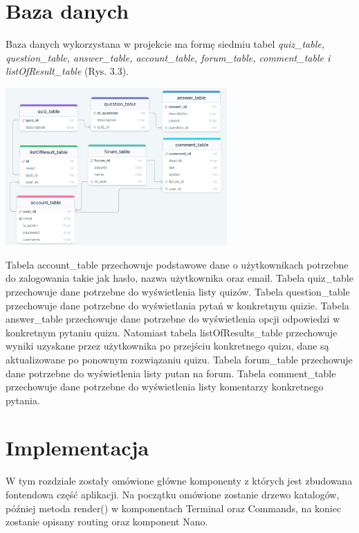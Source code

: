 \documentclass[10pt,a4paper]{report}
\begin{document}
\begin{adjustwidth}{2cm}{2cm}
\section{Baza danych}
\begin{minipage}{1\linewidth}
Baza danych wykorzystana w projekcie ma formę siedmiu tabel \textit{quiz\_table, question\_table, answer\_table, account\_table, forum\_table, comment\_table i listOfResult\_table} (Rys. 3.3).
\vspace{0.3cm}
\end{minipage}
 \begin{minipage}{\linewidth}
\begin{center}
  \includegraphics[width=320px]{img/database.png}
\end{center}
\end{minipage}
\begin{minipage}{1\linewidth}
\vspace{0.3cm}
Tabela account\_table przechowuje podstawowe dane o użytkownikach potrzebne do zalogowania takie jak hasło, nazwa użytkownika oraz email. Tabela  quiz\_table przechowuje dane potrzebne do wyświetlenia listy quizów. Tabela question\_table przechowuje dane potrzebne do wyświetlania pytań w konkretnym quizie. Tabela answer\_table przechowuje dane potrzebne do wyświetlenia opcji odpowiedzi w konkretnym pytaniu quizu. Natomiast tabela listOfResults\_table przechowuje wyniki uzyskane przez użytkownika po przejściu konkretnego quizu, dane są aktualizowane po ponownym rozwiązaniu quizu. Tabela forum\_table przechowuje dane potrzebne do wyświetlenia listy putan na forum. Tabela comment\_table przechowuje dane potrzebne do wyświetlenia listy komentarzy konkretnego pytania. 
\end{minipage}
\section{Implementacja}
\begin{minipage}{1\linewidth}
W tym rozdziale zostały omówione główne komponenty z których jest zbudowana  fontendowa część aplikacji. Na początku omówione zostanie drzewo katalogów, później metoda render() w komponentach Terminal oraz Commands, na koniec zostanie opisany routing oraz komponent Nano. 
\end{minipage}

\end{adjustwidth}
\end{document}
